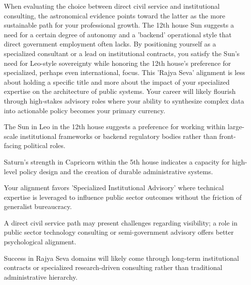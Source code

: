 {\fontsize{9}{13}\selectfont When evaluating the choice between direct civil service and institutional consulting, the astronomical evidence points toward the latter as the more sustainable path for your professional growth. The 12th house Sun suggests a need for a certain degree of autonomy and a 'backend' operational style that direct government employment often lacks. By positioning yourself as a specialized consultant or a lead on institutional contracts, you satisfy the Sun's need for Leo-style sovereignty while honoring the 12th house's preference for specialized, perhaps even international, focus. This 'Rajya Seva' alignment is less about holding a specific title and more about the impact of your specialized expertise on the architecture of public systems. Your career will likely flourish through high-stakes advisory roles where your ability to synthesize complex data into actionable policy becomes your primary currency.}\par\vspace{1.8mm}

\begin{diamondlist}
  \item {\fontsize{8.5}{12}\selectfont The Sun in Leo in the 12th house suggests a preference for working within large-scale institutional frameworks or backend regulatory bodies rather than front-facing political roles.}
  \item {\fontsize{8.5}{12}\selectfont Saturn's strength in Capricorn within the 5th house indicates a capacity for high-level policy design and the creation of durable administrative systems.}
  \item {\fontsize{8.5}{12}\selectfont Your alignment favors 'Specialized Institutional Advisory' where technical expertise is leveraged to influence public sector outcomes without the friction of generalist bureaucracy.}
  \item {\fontsize{8.5}{12}\selectfont A direct civil service path may present challenges regarding visibility; a role in public sector technology consulting or semi-government advisory offers better psychological alignment.}
  \item {\fontsize{8.5}{12}\selectfont Success in Rajya Seva domains will likely come through long-term institutional contracts or specialized research-driven consulting rather than traditional administrative hierarchy.}
\end{diamondlist}


